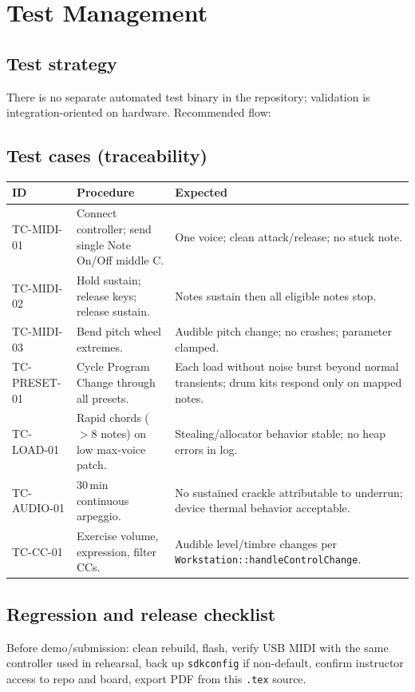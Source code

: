 \documentclass[11pt,a4paper]{article}
\begin{document}
\section{Test Management}

\subsection{Test strategy}
There is no separate automated test binary in the repository; validation is integration-oriented on hardware. Recommended flow:

\subsection{Test cases (traceability)}
\begin{longtable}{p{}p{}p{}}
\toprule
\textbf{ID} & \textbf{Procedure} & \textbf{Expected} \\
\midrule
\endhead
TC-MIDI-01 &
Connect controller; send single Note On/Off middle C. &
One voice; clean attack/release; no stuck note. \\
TC-MIDI-02 &
Hold sustain; release keys; release sustain. &
Notes sustain then all eligible notes stop. \\
TC-MIDI-03 &
Bend pitch wheel extremes. &
Audible pitch change; no crashes; parameter clamped. \\
TC-PRESET-01 &
Cycle Program Change through all presets. &
Each load without noise burst beyond normal transients; drum kits respond only on mapped notes. \\
TC-LOAD-01 &
Rapid chords ($>$8 notes) on low max-voice patch. &
Stealing/allocator behavior stable; no heap errors in log. \\
TC-AUDIO-01 &
30\,min continuous arpeggio. &
No sustained crackle attributable to underrun; device thermal behavior acceptable. \\
TC-CC-01 &
Exercise volume, expression, filter CCs. &
Audible level/timbre changes per \texttt{Workstation::handleControlChange}. \\
\bottomrule
\end{longtable}

\subsection{Regression and release checklist}
Before demo/submission: clean rebuild, flash, verify USB MIDI with the same controller used in rehearsal, back up \texttt{sdkconfig} if non-default, confirm instructor access to repo and board, export PDF from this \texttt{.tex} source.
\end{document}

